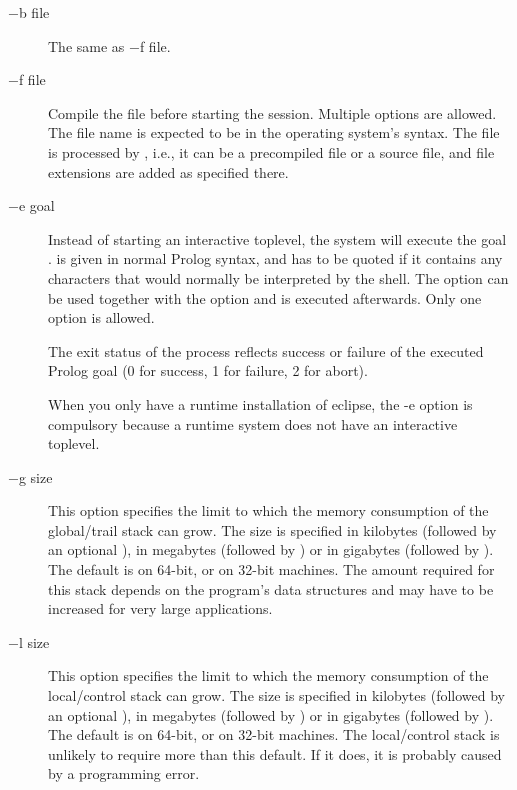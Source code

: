 \begin{description}
\item[$-$b file]
The same as $-$f file.

\item[$-$f file]
Compile the file  before starting the session.
Multiple  options are allowed.
The file name is expected to be in the operating system's syntax.
The file is processed by
,
i.e., it can be a precompiled file or a source file, and file extensions
are added as specified there.

\item[$-$e goal]
Instead of starting an interactive toplevel, the system will execute the
goal .  is given in normal Prolog syntax, and has
to be
quoted if it contains any characters that would normally be interpreted by the
shell. The  option can be used together with the 
option and is executed
afterwards. Only one  option is allowed.

The exit status of the {\eclipse} process reflects success or failure of the
executed Prolog goal (0 for success, 1 for failure, 2 for abort).

When you only have a runtime installation of eclipse, the -e option
is compulsory because a runtime system does not have an interactive
toplevel.


\item[$-$g size]
This option specifies the limit to which the memory consumption of the
{\eclipse} global/trail stack can grow.
The size is specified in kilobytes (followed by an optional ), in
megabytes
(followed by ) or in gigabytes (followed by ).
The default is  on 64-bit, or  on 32-bit machines.
The amount required for this stack depends on the program's data
structures and may have to be increased for very large applications.

\item[$-$l size]
This option specifies the limit to which the memory consumption of the
{\eclipse} local/control stack can grow.
The size is specified in kilobytes (followed by an optional ), in
megabytes
(followed by ) or in gigabytes (followed by ).
The default is  on 64-bit, or  on 32-bit machines.
The local/control stack is unlikely to require more than this default.
If it does, it is probably caused by a programming error.


\end{description}
